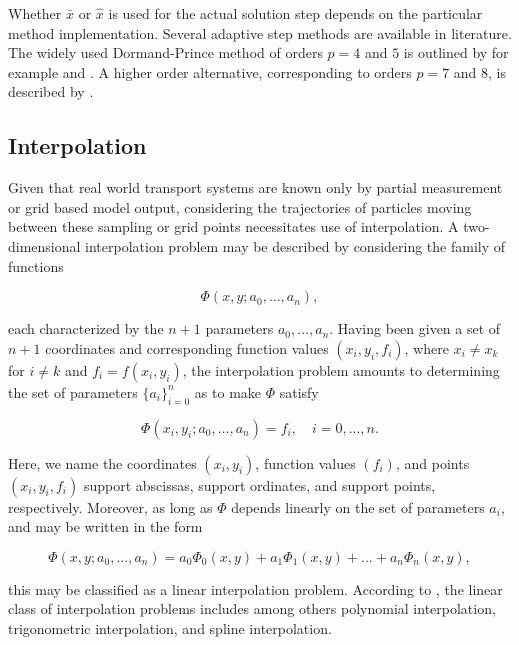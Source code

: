 Whether $\bar{x}$ or $\widehat{x}$ is used for the actual solution step depends on the particular method implementation. Several adaptive step methods are available in literature. The widely used Dormand-Prince method of orders $p=4$ and $5$ is outlined by for example \cite{NumericalAnalysis} and \cite{Dormand-Prince1980}. A higher order alternative, corresponding to orders $p=7$ and $8$, is described by \cite{Dormand-Prince1981}.

\subsection{Interpolation}\label{sec:SplineInterpolation}

Given that real world transport systems are known only by partial measurement or grid based model output, considering the trajectories of particles moving between these sampling or grid points necessitates use of interpolation. A two-dimensional interpolation problem may be described by considering the family of functions

\begin{equation}\label{eq:Phi}
	\Phi (x,y;a_0,\ldots,a_n),
\end{equation}

\noindent each characterized by the $n+1$ parameters $a_0,\ldots ,a_n$. Having been given a set of $n+1$ coordinates and corresponding function values $(x_i,y_i,f_i)$, where $x_i\neq x_k$ for $i\neq k$ and $f_i=f(x_i,y_i)$, the interpolation problem amounts to determining the set of parameters $\{a_i\}_{i=0}^n$ as to make $\Phi$ satisfy

\begin{equation}\label{eq:ItpProblem}
	\Phi(x_i,y_i;a_0,\ldots,a_n) = f_i, \quad i = 0,...,n.
\end{equation}

\noindent Here, we name the coordinates $(x_i,y_i)$, function values $(f_i)$, and points $(x_i,y_i,f_i)$ support abscissas, support ordinates, and support points, respectively. Moreover, as long as $\Phi$ depends linearly on the set of parameters $a_i$, and may be written in the form

\begin{equation}\label{eq:LinearItpProblem}
	\Phi (x,y;a_0,...,a_n) = a_0\Phi_0(x,y) + a_1\Phi_1(x,y) +...+ a_n\Phi_n(x,y),
\end{equation}

\noindent this may be classified as a linear interpolation problem. According to \cite{NumericalAnalysis}, the linear class of interpolation problems includes among others polynomial interpolation, trigonometric interpolation, and spline interpolation.

